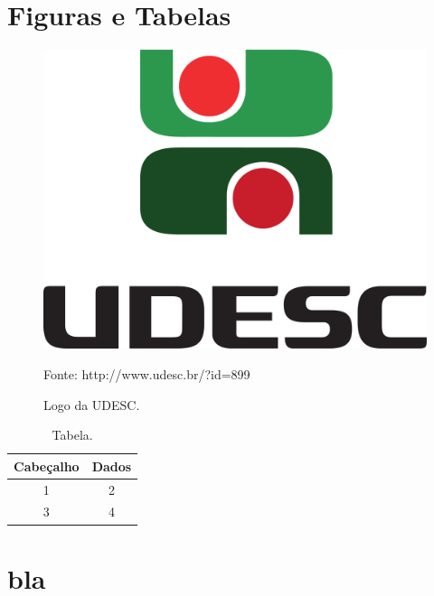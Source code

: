 \documentclass[a4paper,12pt]{udesc}
\begin{document}
\chapter{Figuras e Tabelas}

\begin{figure}[h!]
\centering
\caption{Logo da UDESC.}

\includegraphics[scale=0.04]{fig/Marca_UDESC_vertical.pdf}


Fonte: http://www.udesc.br/?id=899


\end{figure}





\begin{table}[h!]
\caption{Tabela.}
\centering
\vspace{0.2cm}
\begin{tabular}{cc}
\hline
Cabeçalho & Dados \\
\hline

1 & 2\\
3 & 4\\
\hline


\end{tabular}

\end{table}


\chapter{bla}
\end{document}
